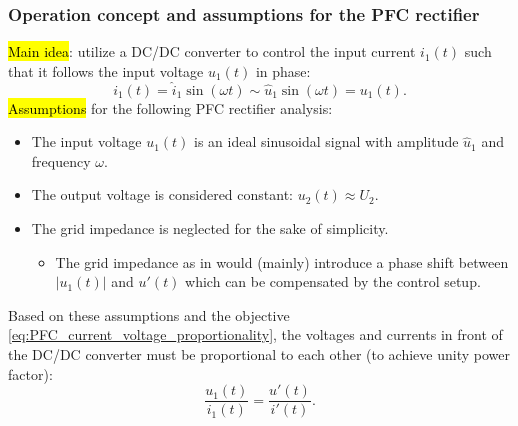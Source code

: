 \begin{frame}
    \frametitle{Operation concept and assumptions for the PFC rectifier} 
    \hl{Main idea}: utilize a DC/DC converter to control the input current $i_1(t)$ such that it follows the input voltage $u_1(t)$ in phase:
    \begin{equation}
        i_1(t) = \hat{i}_1 \sin(\omega t) \sim  \hat{u}_1 \sin(\omega t) = u_1(t).
        \label{eq:PFC_current_voltage_proportionality}
    \end{equation}\pause
    \hl{Assumptions} for the following PFC rectifier analysis:
    \begin{itemize}
        \item The input voltage $u_1(t)$ is an ideal sinusoidal signal with amplitude $\hat{u}_1$ and frequency $\omega$.\pause
        \item The output voltage is considered constant: $u_2(t)\approx U_2$.\pause
        \item The grid impedance is neglected for the sake of simplicity.
        \begin{itemize}
            \item The grid impedance as in  would (mainly) introduce a phase shift between $|u_1(t)|$ and $u'(t)$ which can be compensated by the control setup. 
        \end{itemize}
    \end{itemize}\pause
    Based on these assumptions and the objective \eqref{eq:PFC_current_voltage_proportionality}, the voltages and currents in front of the DC/DC converter must be proportional to each other (to achieve unity power factor):
    \begin{equation}
        \frac{u_1(t)}{i_1(t)} = \frac{u'(t)}{i'(t)}.
    \end{equation}
\end{frame}

